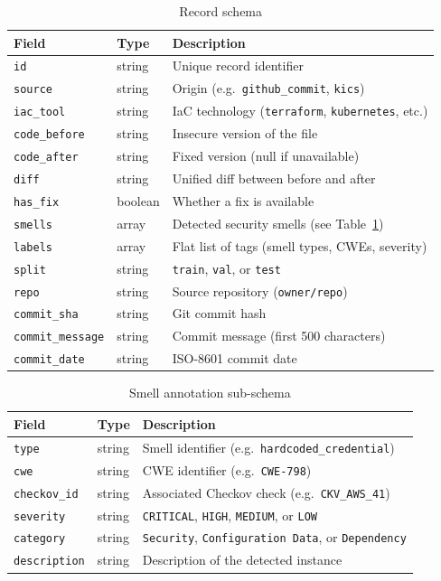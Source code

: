 \documentclass[11pt,a4paper]{article}
\begin{document}
\begin{table}[h]
\centering
\caption{Record schema}
\begin{tabular}{@{}lll@{}}
\toprule
\textbf{Field} & \textbf{Type} & \textbf{Description} \\
\midrule
\texttt{id}              & string  & Unique record identifier \\
\texttt{source}          & string  & Origin (e.g.\ \texttt{github\_commit}, \texttt{kics}) \\
\texttt{iac\_tool}       & string  & IaC technology (\texttt{terraform}, \texttt{kubernetes}, etc.) \\
\texttt{code\_before}    & string  & Insecure version of the file \\
\texttt{code\_after}     & string  & Fixed version (null if unavailable) \\
\texttt{diff}            & string  & Unified diff between before and after \\
\texttt{has\_fix}        & boolean & Whether a fix is available \\
\texttt{smells}          & array   & Detected security smells (see Table~\ref{tab:smell}) \\
\texttt{labels}          & array   & Flat list of tags (smell types, CWEs, severity) \\
\texttt{split}           & string  & \texttt{train}, \texttt{val}, or \texttt{test} \\
\midrule
\texttt{repo}            & string  & Source repository (\texttt{owner/repo}) \\
\texttt{commit\_sha}     & string  & Git commit hash \\
\texttt{commit\_message} & string  & Commit message (first 500 characters) \\
\texttt{commit\_date}    & string  & ISO-8601 commit date \\
\bottomrule
\end{tabular}
\end{table}

\begin{table}[h]
\centering
\caption{Smell annotation sub-schema}
\label{tab:smell}
\begin{tabular}{@{}lll@{}}
\toprule
\textbf{Field} & \textbf{Type} & \textbf{Description} \\
\midrule
\texttt{type}        & string  & Smell identifier (e.g.\ \texttt{hardcoded\_credential}) \\
\texttt{cwe}         & string  & CWE identifier (e.g.\ \texttt{CWE-798}) \\
\texttt{checkov\_id} & string  & Associated Checkov check (e.g.\ \texttt{CKV\_AWS\_41}) \\
\texttt{severity}    & string  & \texttt{CRITICAL}, \texttt{HIGH}, \texttt{MEDIUM}, or \texttt{LOW} \\
\texttt{category}    & string  & \texttt{Security}, \texttt{Configuration Data}, or \texttt{Dependency} \\
\texttt{description} & string  & Description of the detected instance \\
\bottomrule
\end{tabular}
\end{table}
\end{document}
